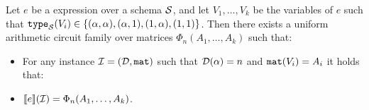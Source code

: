 


\begin{theorem}
\label{th-ml-to-circuits}
Let $e$ be a \langfor expression over a schema $\mathcal{S}$, and let $V_1,\ldots ,V_k$ be the variables of $e$ such that $\texttt{type}_{\mathcal{S}}(V_i)\in \{(\alpha,\alpha), (\alpha,1), (1,\alpha), (1,1)\}$. Then there exists a uniform arithmetic circuit family over matrices $\Phi_n(A_1,\ldots ,A_k)$ such that:
\begin{itemize}
\item For any instance $\mathcal{I} = (\mathcal{D},\texttt{mat})$ such that $\mathcal{D}(\alpha) = n$ and $\texttt{mat}(V_i) = A_i$ it holds that:
\item $\llbracket e \rrbracket(\mathcal{I}) = \Phi_n(A_1,\ldots ,A_k)$.
\end{itemize}
\end{theorem}

